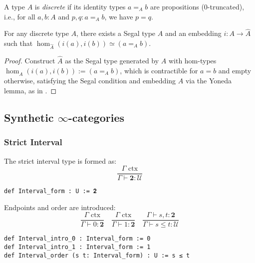 \documentclass{article}
\begin{document}
\begin{definition}
A type $A$ is \emph{discrete} if its identity types $a =_A b$ are propositions (0-truncated), i.e., for all $a, b : A$ and $p, q : a =_A b$, we have $p = q$.
\end{definition}

\begin{theorem}
For any discrete type $A$, there exists a Segal type $\hat{A}$ and an embedding $i : A \to \hat{A}$ such that $\operatorname{hom}_{\hat{A}}(i(a), i(b)) \simeq (a =_A b)$.
\end{theorem}
\begin{proof}
Construct $\hat{A}$ as the Segal type generated by $A$ with hom-types $\operatorname{hom}_{\hat{A}}(i(a), i(b)) := (a =_A b)$, which is contractible for $a = b$ and empty otherwise, satisfying the Segal condition and embedding $A$ via the Yoneda lemma, as in \cite{KL12}.
\end{proof}

\newpage
\subsection{Synthetic $\infty$-categories}

\subsubsection{Strict Interval}

\begin{definition}
The strict interval type is formed as:
\[
\frac{\Gamma \text{ ctx}}{\Gamma \vdash \mathbf{2} : \mathcal{U}}
\]
\begin{lstlisting}[mathescape=true]
def Interval_form : U := 𝟐
\end{lstlisting}
\end{definition}

\begin{definition}
Endpoints and order are introduced:
\[
\frac{\Gamma \text{ ctx}}{\Gamma \vdash 0 : \mathbf{2}} \quad \frac{\Gamma \text{ ctx}}{\Gamma \vdash 1 : \mathbf{2}} \quad \frac{\Gamma \vdash s, t : \mathbf{2}}{\Gamma \vdash s \leq t : \mathcal{U}}
\]
\begin{lstlisting}[mathescape=true]
def Interval_intro_0 : Interval_form := 0
def Interval_intro_1 : Interval_form := 1
def Interval_order (s t: Interval_form) : U := s ≤ t
\end{lstlisting}
\end{definition}
\end{document}

